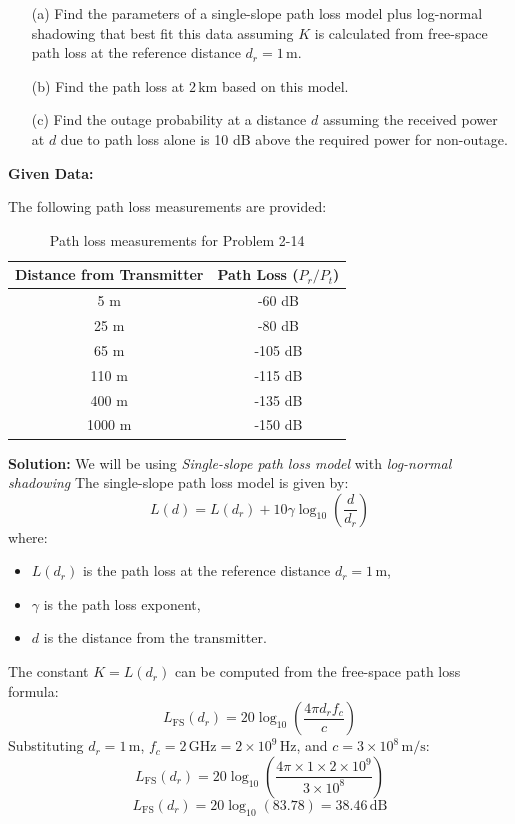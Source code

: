 \documentclass[a4paper,12pt]{book}
\begin{document}
	\begin{itemize}
		\item [(a)] Find the parameters of a single-slope path loss model plus log-normal shadowing that best fit this data assuming \( K \) is calculated from free-space path loss at the reference distance \( d_r = 1 \, \text{m} \).
		\item [(b)] Find the path loss at \( 2 \, \text{km} \) based on this model.
		\item [(c)] Find the outage probability at a distance \( d \) assuming the received power at \( d \) due to path loss alone is 10 dB above the required power for non-outage.
	\end{itemize}
	
	\textbf{Given Data:}
	
	The following path loss measurements are provided:
	
	\begin{table}[h!]
		\centering
		\begin{tabular}{|c|c|}
			\hline
			\textbf{Distance from Transmitter} & \textbf{Path Loss} (\( P_r / P_t \)) \\
			\hline
			5 m    & -60 dB \\
			25 m   & -80 dB \\
			65 m   & -105 dB \\
			110 m  & -115 dB \\
			400 m  & -135 dB \\
			1000 m & -150 dB \\
			\hline
		\end{tabular}
		\caption{Path loss measurements for Problem 2-14}
	\end{table}
	
	\textbf{Solution:} We will be using \textit{Single-slope path loss model} with \textit{log-normal shadowing}
	\newline\newline\noindent
	The single-slope path loss model is given by:
	\[
	L(d) = L(d_r) + 10 \gamma \log_{10} \left( \frac{d}{d_r} \right)
	\]
	where:
	\begin{itemize}
		\item \( L(d_r) \) is the path loss at the reference distance \( d_r = 1 \, \text{m} \),
		\item \( \gamma \) is the path loss exponent,
		\item \( d \) is the distance from the transmitter.
	\end{itemize}
	
	The constant \( K = L(d_r) \) can be computed from the free-space path loss formula:
	\[
	L_{\text{FS}}(d_r) = 20 \log_{10} \left( \frac{4\pi d_r f_c}{c} \right)
	\]
	Substituting \( d_r = 1 \, \text{m} \), \( f_c = 2 \, \text{GHz} = 2 \times 10^9 \, \text{Hz} \), and \( c = 3 \times 10^8 \, \text{m/s} \):
	\[
	L_{\text{FS}}(d_r) = 20 \log_{10} \left( \frac{4 \pi \times 1 \times 2 \times 10^9}{3 \times 10^8} \right)
	\]
	\[
	L_{\text{FS}}(d_r) = 20 \log_{10}(83.78) = 38.46 \, \text{dB}
	\]
	
\end{document}
